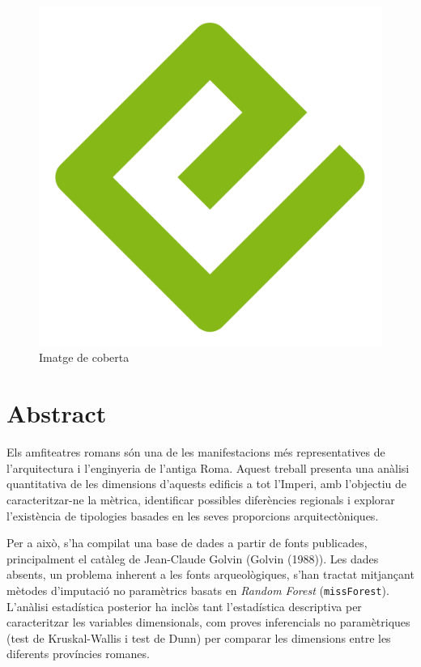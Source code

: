 \documentclass[
  12pt,
  letterpaper,
  DIV=11,
  numbers=noendperiod]{scrreprt}
\begin{document}
\begin{figure}[H]

{\centering \includegraphics[width=0.8\linewidth,height=\textheight,keepaspectratio]{cover.png}

}

\caption{Imatge de coberta}

\end{figure}%


\chapter{Abstract}\label{abstract}

Els amfiteatres romans són una de les manifestacions més representatives
de l'arquitectura i l'enginyeria de l'antiga Roma. Aquest treball
presenta una anàlisi quantitativa de les dimensions d'aquests edificis a
tot l'Imperi, amb l'objectiu de caracteritzar-ne la mètrica, identificar
possibles diferències regionals i explorar l'existència de tipologies
basades en les seves proporcions arquitectòniques.

Per a això, s'ha compilat una base de dades a partir de fonts
publicades, principalment el catàleg de Jean-Claude Golvin (Golvin
(1988)). Les dades absents, un problema inherent a les fonts
arqueològiques, s'han tractat mitjançant mètodes d'imputació no
paramètrics basats en \emph{Random Forest} (\texttt{missForest}).
L'anàlisi estadística posterior ha inclòs tant l'estadística descriptiva
per caracteritzar les variables dimensionals, com proves inferencials no
paramètriques (test de Kruskal-Wallis i test de Dunn) per comparar les
dimensions entre les diferents províncies romanes.
\end{document}
